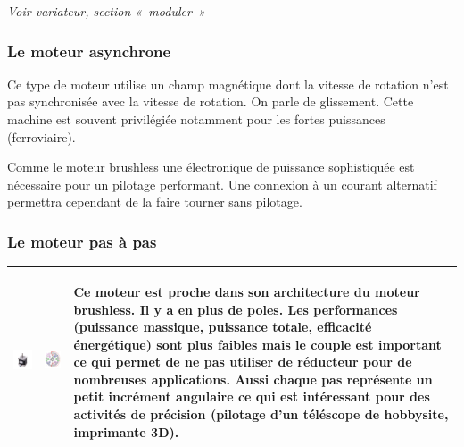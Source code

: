 \emph{Voir variateur, section «~moduler~»} \\

\subsubsection{Le moteur asynchrone}

Ce type de moteur utilise un champ magnétique dont la vitesse de
rotation n'est pas synchronisée avec la vitesse de rotation. On parle de
glissement. Cette machine est souvent privilégiée notamment pour les
fortes puissances (ferroviaire).

Comme le moteur brushless une électronique de puissance sophistiquée est
nécessaire pour un pilotage performant. Une connexion à un courant
alternatif permettra cependant de la faire tourner sans pilotage.

\hypertarget{le-moteur-pas-uxe0-pas}{%
\subsubsection{Le moteur pas à pas}\label{le-moteur-pas-uxe0-pas}}

\begin{longtable}[]{@{}lll@{}}
\toprule
\endhead
\includegraphics[width=2.0855in,height=2.0855in]{media/image72.png} &
\includegraphics[width=1.875in,height=1.90625in]{media/image73.png} & Ce
moteur est proche dans son architecture du moteur brushless. Il y a en
plus de poles. Les performances (puissance massique, puissance totale,
efficacité énergétique) sont plus faibles mais le couple est important
ce qui permet de ne pas utiliser de réducteur pour de nombreuses
applications. Aussi chaque pas représente un petit incrément angulaire
ce qui est intéressant pour des activités de précision (pilotage d'un
téléscope de hobbysite, imprimante 3D). \\
\bottomrule
\end{longtable}

